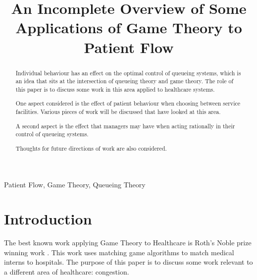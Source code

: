 \documentclass[a4paper,11pt]{article}
\title{An Incomplete Overview of Some Applications of Game Theory to Patient Flow}
\begin{document}
\maketitle

\author{
}

%
%
%

\vspace{8mm}

\begin{abstract}

Individual behaviour has an effect on the optimal control of queueing systems, which is an idea that sits at the intersection of queueing theory and game theory.
The role of this paper is to discuss some work in this area applied to healthcare systems.

One aspect considered is the effect of patient behaviour when choosing between service facilities.
Various pieces of work will be discussed that have looked at this area.

A second aspect is the effect that managers may have when acting rationally in their control of queueing systems.

Thoughts for future directions of work are also considered.
\end{abstract}

\bigskip
\begin{keywords}
Patient Flow, Game Theory, Queueing Theory

\bigskip
{}
\end{keywords}


\newpage

\section{Introduction}

The best known work applying Game Theory to Healthcare is Roth's Noble prize winning work \cite{roth_redesign_1999}.
This work uses matching game algorithms to match medical interns to hospitals.
The purpose of this paper is to discuss some work relevant to a different area of healthcare: congestion.
\end{document}

